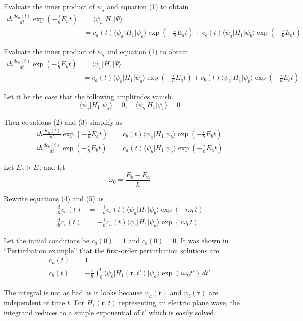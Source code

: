 Evaluate the inner product of $\psi_a$ and equation (1) to obtain
\begin{align*}
i\hbar\frac{dc_a(t)}{dt}\exp\left(-\tfrac{i}{\hbar}E_at\right)
&=\langle\psi_a|H_1|\Psi\rangle
\\
&=c_a(t)\langle\psi_a|H_1|\psi_a\rangle\exp\left(-\tfrac{i}{\hbar}E_at\right)
+c_b(t)\langle\psi_a|H_1|\psi_b\rangle\exp\left(-\tfrac{i}{\hbar}E_bt\right)
\tag{2}
\end{align*}

Evaluate the inner product of $\psi_b$ and equation (1) to obtain
\begin{align*}
i\hbar\frac{dc_b(t)}{dt}\exp\left(-\tfrac{i}{\hbar}E_bt\right)
&=\langle\psi_b|H_1|\Psi\rangle
\\
&=c_a(t)\langle\psi_b|H_1|\psi_a\rangle\exp\left(-\tfrac{i}{\hbar}E_at\right)
+c_b(t)\langle\psi_b|H_1|\psi_b\rangle\exp\left(-\tfrac{i}{\hbar}E_bt\right)
\tag{3}
\end{align*}

Let it be the case that the following amplitudes vanish.
\begin{equation*}
\langle\psi_a|H_1|\psi_a\rangle=0,\quad \langle\psi_b|H_1|\psi_b\rangle=0
\end{equation*}

Then equations (2) and (3) simplify as
\begin{align*}
i\hbar\frac{dc_a(t)}{dt}\exp\left(-\tfrac{i}{\hbar}E_at\right)
&=c_b(t)\langle\psi_a|H_1|\psi_b\rangle\exp\left(-\tfrac{i}{\hbar}E_bt\right)
\tag{4}
\\
i\hbar\frac{dc_b(t)}{dt}\exp\left(-\tfrac{i}{\hbar}E_bt\right)
&=c_a(t)\langle\psi_b|H_1|\psi_a\rangle\exp\left(-\tfrac{i}{\hbar}E_at\right)
\tag{5}
\end{align*}

Let $E_b>E_a$ and let
\begin{equation*}
\omega_0=\frac{E_b-E_a}{\hbar}
\end{equation*}

Rewrite equations (4) and (5) as
\begin{align*}
\frac{d}{dt}c_a(t)&=-\frac{i}{\hbar}c_b(t)\langle\psi_a|H_1|\psi_b\rangle\exp(-i\omega_0t)
\\
\frac{d}{dt}c_b(t)&=-\frac{i}{\hbar}c_a(t)\langle\psi_b|H_1|\psi_a\rangle\exp(i\omega_0t)
\end{align*}

Let the initial conditions be $c_a(0)=1$ and $c_b(0)=0$.
It was shown in ``Perturbation example'' that the first-order perturbation solutions are
\begin{align*}
c_a(t)&=1
\\
c_b(t)&=-\frac{i}{\hbar}\int_0^t
\langle\psi_b|H_1(\mathbf r,t')|\psi_a\rangle\exp(i\omega_0t')\,dt'
\end{align*}

The integral is not as bad as it looks because $\psi_a(\mathbf r)$ and $\psi_b(\mathbf r)$
are independent of time $t$.
For $H_1(\mathbf r,t)$ representing an electric plane wave,
the integrand reduces to a simple exponential of $t'$ which is easily solved.



